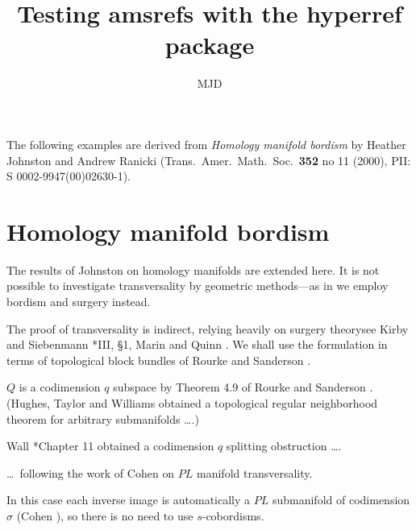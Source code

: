 \documentclass{article}
\newenvironment{dual}{%
  \par\medskip
  \trivlist\item[]%
}{%
  \endtrivlist
}
\begin{document}
\title{Testing amsrefs with the hyperref package}
\author{MJD}
\maketitle

   The following examples are derived from
   \emph{Homology manifold bordism} by Heather Johnston and Andrew
   Ranicki (Trans.\ Amer.\ Math.\ Soc.\ \textbf{352} no 11 (2000), PII: S
   0002-9947(00)02630-1).

\setcounter{section}{3}
\section{Homology manifold bordism}

\begin{dual}
The results of Johnston \cite{Jo} on homology
manifolds are extended here. It is not
possible to investigate transversality by
geometric methods---as in \cite{Jo} we employ
bordism and surgery instead.
\end{dual}

\begin{dual}
The proof of transversality is indirect,
relying heavily on surgery theory\mdash see
Kirby and Siebenmann \cite{KS}*{III, \S 1},
Marin \cite{M} and Quinn \cite{Q3}. We shall
use the formulation in terms of topological
block bundles of Rourke and Sanderson
\cite{RS}.
\end{dual}

\begin{dual}
$Q$ is a codimension $q$ subspace by Theorem
4.9 of Rourke and Sanderson \cite{RS}.
(Hughes, Taylor and Williams \cite{HTW}
obtained a topological regular neighborhood
theorem for arbitrary submanifolds \dots.)
\end{dual}

\begin{dual}
Wall \cite{Wa}*{Chapter 11} obtained a
codimension $q$ splitting obstruction \dots.
\end{dual}

\begin{dual}
\dots\ following the work of Cohen \cite{Co}
on $PL$ manifold transversality.
\end{dual}

\begin{dual}
In this case each inverse image is
automatically a $PL$ submanifold of
codimension $\sigma$ (Cohen \cite{Co}), so
there is no need to use $s$-cobordisms.
\end{dual}
\end{document}
